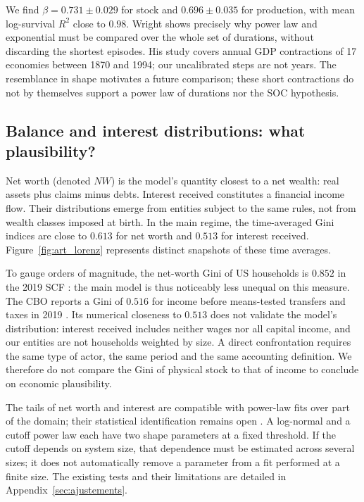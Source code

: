 We find $\beta=0.731\pm0.029$ for stock and $0.696\pm0.035$ for
production, with mean log-survival $R^2$ close to $0.98$. Wright
\cite{wright} shows precisely why power law and exponential must be
compared over the whole set of durations, without discarding the
shortest episodes. His study covers annual GDP contractions of 17
economies between 1870 and 1994; our uncalibrated steps are not years.
The resemblance in shape motivates a future comparison; these short
contractions do not by themselves support a power law of durations nor
the SOC hypothesis.

\subsection{Balance and interest distributions: what plausibility?}
Net worth (denoted $NW$) is the model's quantity closest to a net
wealth: real assets plus claims minus debts. Interest received
constitutes a financial income flow. Their distributions emerge from
entities subject to the same rules, not from wealth classes imposed at
birth. In the main regime, the time-averaged Gini indices are close to
$0.613$ for net worth and $0.513$ for interest received.
Figure~\ref{fig:art_lorenz} represents distinct snapshots of these time
averages.


To gauge orders of magnitude, the net-worth Gini of US households is
$0.852$ in the 2019 SCF \cite{fedgini}: the main model is thus
noticeably less unequal on this measure. The CBO reports a Gini of
$0.516$ for income before means-tested transfers and taxes in 2019
\cite{cbogini}. Its numerical closeness to $0.513$ does not validate the
model's distribution: interest received includes neither wages nor all
capital income, and our entities are not households weighted by size.
A direct confrontation requires the same type of actor, the same
period and the same accounting definition. We therefore do not compare
the Gini of physical stock to that of income to conclude on economic
plausibility.

The tails of net worth and interest are compatible with power-law fits
over part of the domain; their statistical identification remains open
\cite{clauset,wildauer}. A log-normal and a cutoff power law each have
two shape parameters at a fixed threshold. If the cutoff depends on
system size, that dependence must be estimated across several sizes; it
does not automatically remove a parameter from a fit performed at a
finite size. The existing tests and their limitations are detailed in
Appendix~\ref{sec:ajustements}.

